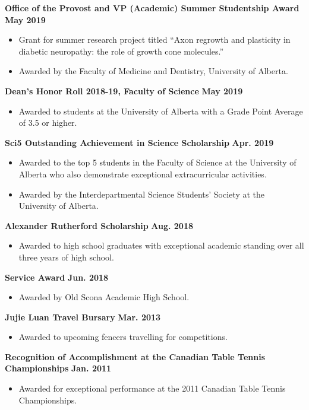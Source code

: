 \documentclass{article}
\begin{document}
    \textbf{Office of the Provost and VP (Academic) Summer Studentship Award} \hfill \textbf{May 2019}
        \begin{itemize}
            \item Grant for summer research project titled ``Axon regrowth and plasticity in diabetic neuropathy: the role of growth cone molecules.''
            \item Awarded by the Faculty of Medicine and Dentistry, University of Alberta.
        \end{itemize}
    \textbf{Dean's Honor Roll 2018-19, Faculty of Science} \hfill \textbf{May 2019}
        \begin{itemize}
            \item Awarded to students at the University of Alberta with a Grade Point Average of 3.5 or higher.
        \end{itemize}
    \textbf{Sci5 Outstanding Achievement in Science Scholarship} \hfill \textbf{Apr. 2019}
        \begin{itemize}
            \item Awarded to the top 5 students in the Faculty of Science at the University of Alberta who also demonstrate exceptional extracurricular activities.
            \item Awarded by the Interdepartmental Science Students' Society at the University of Alberta.
        \end{itemize}
    \textbf{Alexander Rutherford Scholarship} \hfill \textbf{Aug. 2018}
        \begin{itemize}
            \item Awarded to high school graduates with exceptional academic standing over all three years of high school.
        \end{itemize}
    \textbf{Service Award} \hfill \textbf{Jun. 2018}
        \begin{itemize}
            \item Awarded by Old Scona Academic High School.
        \end{itemize}
    \textbf{Jujie Luan Travel Bursary} \hfill \textbf{Mar. 2013}
        \begin{itemize}
            \item Awarded to upcoming fencers travelling for competitions.
        \end{itemize}
    \textbf{Recognition of Accomplishment at the Canadian Table Tennis Championships} \hfill \textbf{Jan. 2011}
        \begin{itemize}
            \item Awarded for exceptional performance at the 2011 Canadian Table Tennis Championships.
        \end{itemize}
\end{document}
